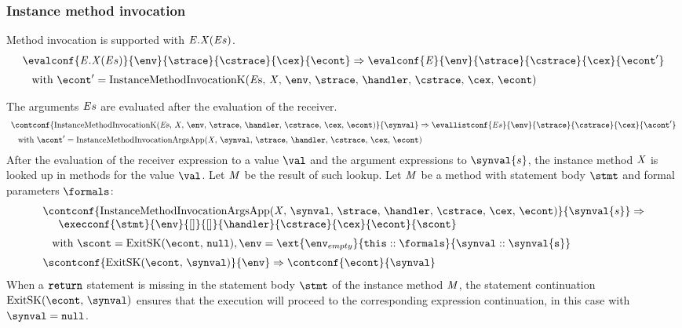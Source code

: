 \documentclass{article}
\begin{document}
\subsubsection{Instance method invocation}
\label{subsubsec:instance-method-invoc}
\newcommand{\InstanceMethodInvocation}[3]{#1.#2(#3)}
\newcommand{\InstanceMethodInvocationK}{\mathrm{InstanceMethodInvocationK(\expressionsmeta,\,\idmeta,\,\env,\,\strace,\,\handler,\,\cstrace,\,\cex,\,\econt)}}
Method invocation is supported with $\InstanceMethodInvocation{\expressionmeta}{\idmeta}{\expressionsmeta}$.
\[
  \begin{array}{l}
	\evalconf{\InstanceMethodInvocation{\expressionmeta}{\idmeta}{\expressionsmeta}}{\env}{\strace}{\cstrace}{\cex}{\econt}
	\Rightarrow
	\evalconf{\expressionmeta}{\env}{\strace}{\cstrace}{\cex}{\econt'}
	\\[2mm]
	\hspace{3mm}\textrm{with } \econt' = \InstanceMethodInvocationK
  \end{array}
\]

The arguments $\mathit{E}{s}$ are evaluated after the evaluation of the receiver.
\newcommand{\InstanceMethodInvocationArgsApp}{\mathrm{InstanceMethodInvocationArgsApp(\idmeta,\,\synval,\,\strace,\,\handler,\,\cstrace,\,\cex,\,\econt)}}
\[
  \begin{array}{l}
	\contconf{\InstanceMethodInvocationK}{\synval}
	\Rightarrow
	\evallistconf{\expressionsmeta}{\env}{\strace}{\cstrace}{\cex}{\acont'}
	\\[2mm]
	\hspace{3mm}\textrm{with } \acont' = \InstanceMethodInvocationArgsApp
  \end{array}
\]
\noindent
After the evaluation of the receiver expression to a value $\val$ and the argument expressions to $\synval{s}$, the instance method $\mathit{X}$ is looked up in methods for the value $\val$. Let $\mathit{M}$ be the result of such lookup. Let $\mathit{M}$ be a method with statement body $\stmt$ and formal parameters $\formals$:
\[
  \begin{array}{l}
	\contconf{\InstanceMethodInvocationArgsApp}{\synval{s}}
	\Rightarrow \\
	\hspace{5mm}\execconf{\stmt}{\env}{[]}{[]}{\handler}{\cstrace}{\cex}{\econt}{\scont}
	\\[2mm]
	\hspace{3mm}\textrm{with } \scont = \ExitSK{\tt{null}}, \env = \ext{\env_{empty}}{\this :: \formals}{\synval :: \synval{s}}\\[2mm]
	\scontconf{\ExitSK{\synval}}{\env} \Rightarrow \contconf{\econt}{\synval}
  \end{array}
\]
When a $\tt{return}$ statement is missing in the statement body $\stmt$ of the instance method $\mathit{M}$, the statement continuation $\ExitSK{\synval}$ ensures that the execution will proceed to the corresponding expression continuation, in this case with $\synval = \tt{null}$.
\end{document}
